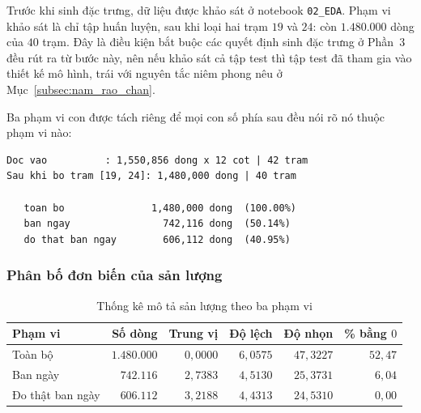 \documentclass[12pt, a4paper]{report}
\begin{document}
Trước khi sinh đặc trưng, dữ liệu được khảo sát ở notebook \texttt{02\_EDA}. Phạm vi khảo sát là
chỉ tập huấn luyện, sau khi loại hai trạm $19$ và $24$: còn $1.480.000$ dòng của
$40$ trạm. Đây là điều kiện bắt buộc các quyết định sinh đặc trưng ở Phần~$3$ đều rút ra
từ bước này, nên nếu khảo sát cả tập test thì tập test đã tham gia vào thiết kế mô hình,
trái với nguyên tắc niêm phong nêu ở Mục~\ref{subsec:nam_rao_chan}.

Ba phạm vi con được tách riêng để mọi con số phía sau đều nói rõ nó thuộc phạm vi nào:

\begingroup
\par{}\vspace{8pt}
\small\renewcommand{\baselinestretch}{1.0}\selectfont
\begin{verbatim}
Doc vao          : 1,550,856 dong x 12 cot | 42 tram
Sau khi bo tram [19, 24]: 1,480,000 dong | 40 tram

   toan bo               1,480,000 dong  (100.00%)
   ban ngay                742,116 dong  (50.14%)
   do that ban ngay        606,112 dong  (40.95%)
\end{verbatim}
\par\vspace{8pt}
\endgroup
\subsubsection{Phân bố đơn biến của sản lượng}

\begin{table}[htbp]
\centering
\caption{Thống kê mô tả sản lượng theo ba phạm vi}
\label{tab:eda_mo_ta}
\small
\begin{tabular}{l r r r r r}
\toprule
\textbf{Phạm vi} & \textbf{Số dòng} & \textbf{Trung vị} & \textbf{Độ lệch} & \textbf{Độ nhọn} & \textbf{\% bằng $0$} \\
\midrule
Toàn bộ          & $1.480.000$ & $0{,}0000$ & $6{,}0575$ & $47{,}3227$ & $52{,}47$ \\
Ban ngày         & $742.116$   & $2{,}7383$ & $4{,}5130$ & $25{,}3731$ & $6{,}04$ \\
Đo thật ban ngày & $606.112$   & $3{,}2188$ & $4{,}4313$ & $24{,}5310$ & $0{,}00$ \\
\bottomrule
\end{tabular}


\end{table}
\end{document}
